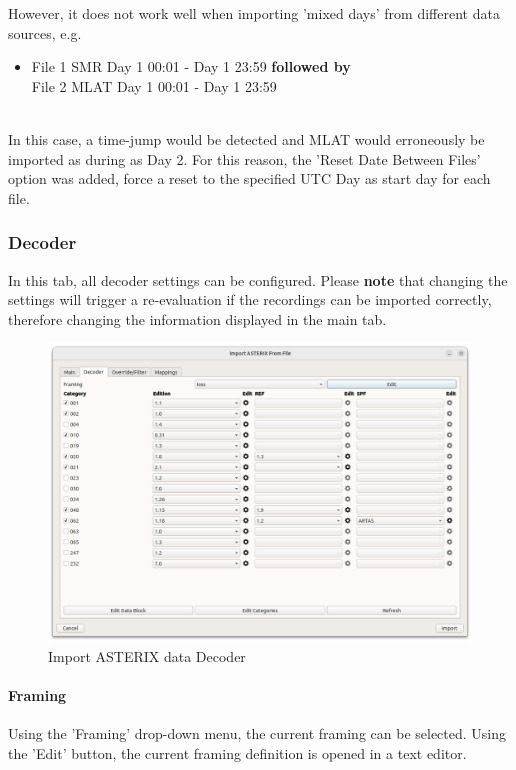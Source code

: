 However, it does not work well when importing 'mixed days' from different data sources, e.g. 
\begin{itemize}
\item File 1 SMR Day 1 00:01 - Day 1 23:59 \textbf{followed by} \\{} File 2 MLAT Day 1 00:01 - Day 1 23:59
\end{itemize}
\ \\

 In this case, a time-jump would be detected and MLAT would erroneously be imported as during as Day 2. For this reason, the 'Reset Date Between Files' option was added, force a reset to the specified UTC Day as start day for each file. \\


\subsubsection{Decoder}

In this tab, all decoder settings can be configured. Please \textbf{note} that changing the settings will trigger a re-evaluation if the recordings can be imported correctly, 
therefore changing the information displayed in the main tab.

\begin{figure}[H]
  \center
    \hspace*{-0.5cm}
    \includegraphics[width=17cm]{figures/asterix_import_data_decoder.png}
  \caption{Import ASTERIX data Decoder}
\end{figure}

\paragraph{Framing}
Using the 'Framing' drop-down menu, the current framing can be selected. Using the 'Edit' button, the current framing definition is opened in a text editor.

